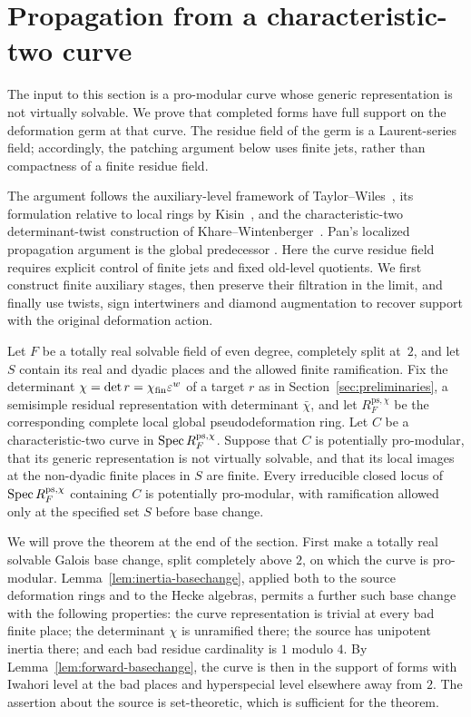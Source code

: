 \section{Propagation from a characteristic-two curve}
\label{sec:propagation}

The input to this section is a pro-modular curve whose generic
representation is not virtually solvable.  We prove that completed forms
have full support on the deformation germ at that curve.  The residue
field of the germ is a Laurent-series field; accordingly, the patching
argument below uses finite jets, rather than compactness of a finite
residue field.

The argument follows the auxiliary-level framework of
Taylor--Wiles~\cite{TaylorWiles1995}, its formulation relative to local
rings by Kisin~\cite[Section~3.3]{Kisin2009FiniteFlat}, and the
characteristic-two determinant-twist construction of
Khare--Wintenberger~\cite[Section~9.1.3]{KhareWintenberger2009II}.
Pan's localized propagation argument is the global predecessor
\cite{Pan2022}. Here the curve residue field requires explicit control
of finite jets and fixed old-level quotients. We first construct
finite auxiliary stages, then preserve their filtration in the limit,
and finally use twists, sign intertwiners and diamond augmentation to
recover support with the original deformation action.

\begin{theorem}\label{thm:localized-propagation}
Let \(F\) be a totally real solvable field of even degree, completely
split at~\(2\), and let \(S\) contain its real and dyadic places and
the allowed finite ramification. Fix the determinant
\(\chi=\det r=\chi_{\mathrm{fin}}\varepsilon^w\) of a target \(r\) as in
Section~\ref{sec:preliminaries}, a semisimple residual representation
with determinant \(\bar\chi\), and let
\(R_F^{\mathrm{ps},\chi}\) be the corresponding complete local global
pseudodeformation ring. Let $C$ be a characteristic-two curve in
\(\operatorname{Spec} R_F^{\mathrm{ps},\chi}\).  Suppose that $C$ is potentially pro-modular,
that its generic representation is not virtually solvable, and that its
local images at the non-dyadic finite places in $S$ are finite.  Every
irreducible closed locus of \(\operatorname{Spec} R_F^{\mathrm{ps},\chi}\)
containing $C$ is potentially pro-modular, with ramification allowed
only at the specified set \(S\) before base change.
\end{theorem}

We will prove the theorem at the end of the section.  First make a
totally real solvable Galois base change, split completely above $2$, on which
the curve is pro-modular.  Lemma~\ref{lem:inertia-basechange}, applied
both to the source deformation rings and to the Hecke algebras, permits
a further such base change with the following properties: the curve
representation is trivial at every bad finite place; the determinant
$\chi$ is unramified there; the source has unipotent inertia there; and
each bad residue cardinality is $1$ modulo $4$. By
Lemma~\ref{lem:forward-basechange}, the curve is then in
the support of forms with Iwahori level at the bad places and
hyperspecial level elsewhere away from $2$.  The assertion about the
source is set-theoretic, which is sufficient for the theorem.

